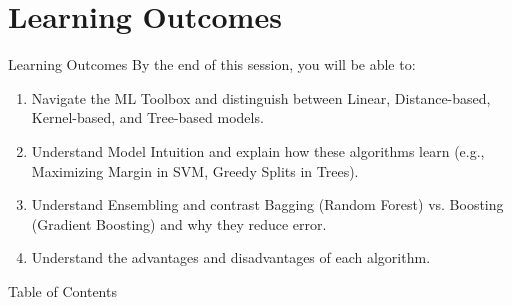 \section{Learning Outcomes}
\begin{frame}{Learning Outcomes}
    By the end of this session, you will be able to:
    
    \vspace{0.5em}
    \begin{enumerate}
        \item Navigate the ML Toolbox and distinguish between Linear, Distance-based, Kernel-based, and Tree-based models.
        \item Understand Model Intuition and explain how these algorithms learn (e.g., Maximizing Margin in SVM, Greedy Splits in Trees).
        \item Understand Ensembling and contrast Bagging (Random Forest) vs. Boosting (Gradient Boosting) and why they reduce error.
        \item Understand the advantages and disadvantages of each algorithm.
    \end{enumerate}
    
\end{frame}



\begin{frame}[allowframebreaks]{Table of Contents}
    \tableofcontents
\end{frame}

